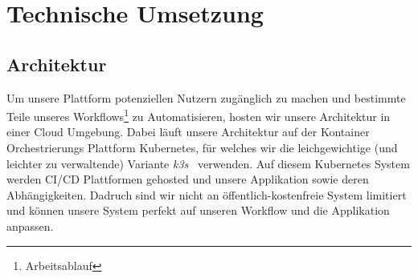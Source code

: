 
\chapter{Technische Umsetzung}


\section{Architektur}
Um unsere Plattform potenziellen Nutzern zugänglich zu machen und bestimmte Teile unseres Workflows\footnote{Arbeitsablauf} zu Automatisieren, hosten wir unsere Architektur in einer Cloud Umgebung.
Dabei läuft unsere Architektur auf der Kontainer Orchestrierungs Plattform Kubernetes, für welches wir die leichgewichtige (und leichter zu verwaltende) Variante \textit{k3s}~\parencite{web/k3s} verwenden.
Auf diesem Kubernetes System werden \ac{CI/CD} Plattformen gehosted und unsere Applikation sowie deren Abhängigkeiten. Dadruch sind wir nicht an öffentlich-kostenfreie System limitiert und können unsere
System perfekt auf unseren Workflow und die Applikation anpassen.

